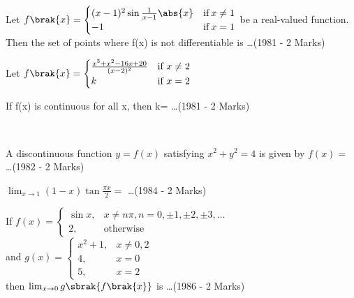 \iffalse
  \title{Mains.11.A}
  \author{Shiven Bajpai}
  \section{fitb}
\fi

\item{ 
    Let $f\brak{x}= \begin{cases}
	   (x-1)^2 \sin\frac{1}{x-1}\abs{x} & \text{if} \: x\ne1 \\
      -1 & \text{if} \: x = 1 
    \end{cases} $
    be a real-valued function. Then the set of points where f(x) is not differentiable is \ldots \hfill (1981 - 2 Marks)
}\\

\item{
    Let $f\brak{x}= \begin{cases}
    \frac{x^3+x^2-16x+20}{(x-2)^2}& \text{if } x \ne 2\\
    k& \text{if } x = 2
    \end{cases}$
    
    If f(x) is continuous for all x, then k= \ldots \hfill(1981 - 2 Marks)
}\\


\item{
    A discontinuous function $y=f(x)$ satisfying $x^2 + y^2 = 4$ is given by $f(x)=$ \ldots \hfill (1982 - 2 Marks)
}\\

\item {
    $\lim_{x\to1} (1-x) \tan\frac{\pi x}{2} = $ \ldots \hfill (1984 - 2 Marks)
}\\
    
\item {
    If $f(x)= \begin{cases}\sin x,& x \ne n\pi, n = 0, \pm1, \pm2, \pm3, \ldots \\
    2,& \text{otherwise}\end{cases}$\\
    and $g(x) = \begin{cases}x^2 + 1,& x \ne 0, 2\\
    4,& x=0\\
    5,& x=2\end{cases}$\\
    then $\lim_{x\to0} g\sbrak{f\brak{x}}$ is \ldots \hfill(1986 - 2 Marks)
}\\

